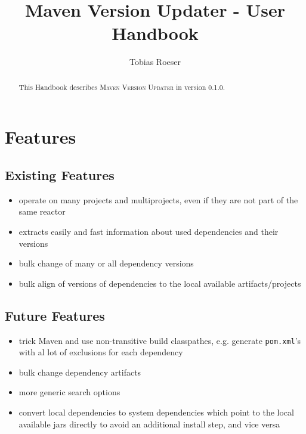 \documentclass[a4paper,11pt,english,oneside,halfparskip]{scrartcl}
\title{Maven Version Updater - User Handbook}
\author{Tobias Roeser}
\newcommand{\MVU}{\textsc{\small{}Maven Version Updater}}
\newcommand{\VERSION}{0.1.0}
\newcommand{\code}[1]{\texttt{#1}}
\newcommand{\pom}{\code{pom.xml}}
\begin{document}
\renewcommand{\labelitemi}{$\triangleright$}

\maketitle

\begin{abstract}
This Handbook describes \MVU{} in version \VERSION{}.

\end{abstract}

\ifpdf{}\fi
\tableofcontents

\section{Features}

\subsection{Existing Features}

\begin{itemize}
 \item operate on many projects and multiprojects, even if they are not part of the same reactor
 \item extracts easily and fast information about used dependencies and their versions
 \item bulk change of many or all dependency versions
 \item bulk align of versions of dependencies to the local available artifacts/projects
\end{itemize}

\subsection{Future Features}

\begin{itemize}
 \item trick Maven and use non-transitive build classpathes, e.g. generate \pom's with al lot of exclusions for each dependency
 \item bulk change dependency artifacts
 \item more generic search options
 \item convert local dependencies to system dependencies which point to the local available jars directly to avoid an additional install step, and vice versa
\end{itemize}
\end{document}
